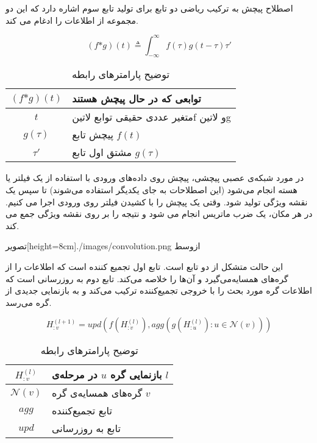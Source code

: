 
اصطلاح پیچش به ترکیب ریاضی دو تابع برای تولید تابع سوم اشاره دارد که این دو مجموعه از اطلاعات را ادغام می کند.

\begin{equation}
  \label{eq:conv}
(f \text{*} g)(t) \triangleq \int_{-\infty}^\infty f(\tau)g(t - \tau)\tau'
\end{equation}


\begin{table}[h]
  \centering
  \caption{توضیح پارامترهای رابطه }
  \begin{tabular}{|c|p{}|}
    \hline
    $(f \text{*} g)(t)$ & توابعی که در حال پیچش هستند \\
    \hline
    $t$ & متغیر عددی حقیقی توابع ‌لاتین{f}  و ‌لاتین{g} \\
    \hline
    $g(\tau)$ & پیچش تابع $f(t)$ \\
    \hline
    $\tau'$ & مشتق اول تابع $g(\tau)$ \\
    \hline
  \end{tabular}
  \label{tbl:distance}
\end{table}

در مورد شبکه‌ی عصبی پیچشی، پیچش روی داده‌های ورودی با استفاده از یک فیلتر یا هسته انجام می‌شود (این اصطلاحات به جای یکدیگر استفاده می‌شوند) تا سپس یک نقشه ویژگی تولید شود. وقتی یک پیچش را با کشیدن فیلتر روی ورودی اجرا می کنیم. در هر مکان، یک ضرب ماتریس انجام می شود و نتیجه را بر روی نقشه ویژگی جمع می کند.

  ‌تصویر[height=8cm]{./images/convolution.png}
  ‌ازوسط

این حالت متشکل از دو تابع است. تابع اول تجمیع کننده است که اطلاعات را از گره‌های همسایه‌می‌گیرد و آن‌ها را خلاصه می‌کند. تابع دوم به روزرسانی است که اطلاعات گره مورد بحث را با خروجی تجمیع‌کننده ترکیب می‌کند و به بازنمایی جدیدی از گره می‌رسد.


\begin{equation}
  \label{eq:spatial}
H_{:v}^{(l+1)}=upd(f(H_{:v}^{(l)}),agg(g(H_{:u}^{(l)}): u\in \mathcal{N}(v)))
\end{equation}


\begin{table}[h]
  \centering
  \caption{توضیح پارامترهای رابطه }
  \begin{tabular}{|c|p{}|}
    \hline
    $H_{:v}^{(l)}$ & بازنمایی گره $u$ در مرحله‌ی $l$ \\
    \hline
    $\mathcal{N}(v)$ & گره‌های همسایه‌ی گره $v$ \\
    \hline
    $agg$ & تابع تجمیع‌کننده \\
    \hline
    $upd$ & تابع به روزرسانی \\
    \hline
  \end{tabular}
  \label{tbl:distance}
\end{table}


